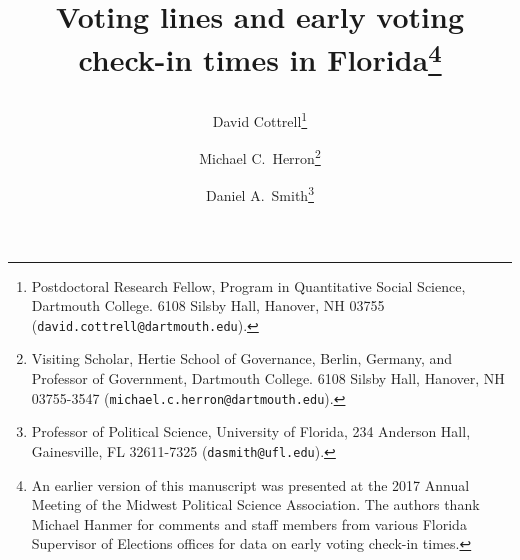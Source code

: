 \documentclass[12pt,titlepage]{article}
\begin{document}
\sloppy
\thispagestyle{empty}


\renewcommand{\topfraction}{.85}
\renewcommand{\bottomfraction}{.7}
\renewcommand{\textfraction}{.15}
\renewcommand{\floatpagefraction}{.66}
\renewcommand{\dbltopfraction}{.66}
\renewcommand{\dblfloatpagefraction}{.66}



\title{Voting lines and early voting check-in times in
  Florida\thanks{An earlier version of this manuscript was presented
    at the 2017 Annual Meeting of the Midwest Political Science
    Association.  The authors thank Michael Hanmer for comments and
    staff members from various Florida Supervisor of Elections offices
    for data on early voting check-in times.}\author{David
    Cottrell\thanks{Postdoctoral Research Fellow, Program in
      Quantitative Social Science, Dartmouth College.  6108 Silsby
      Hall, Hanover, NH 03755
      (\texttt{david.cottrell@dartmouth.edu}).} \and Michael C.\
    Herron\thanks{Visiting Scholar, Hertie School of Governance,
      Berlin, Germany, and Professor of Government, Dartmouth College.
      6108 Silsby Hall, Hanover, NH 03755-3547
      (\texttt{michael.c.herron@dartmouth.edu}).} \and Daniel A.\
    Smith\thanks{Professor of Political Science, University of
      Florida, 234 Anderson Hall, Gainesville, FL 32611-7325
      (\texttt{dasmith@ufl.edu}).}}\vspace{1cm}}

\maketitle \doublespacing 

\end{document}
